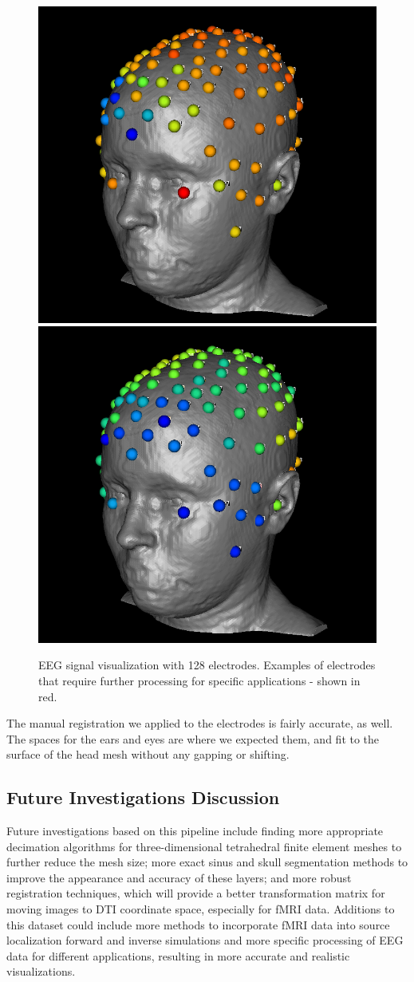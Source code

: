 \begin{figure}[H]
\begin{center}
\includegraphics[width=.49\textwidth]{Figures/128_eeg_1}
\includegraphics[width=.49\textwidth]{Figures/128_eeg_2}
\caption{EEG signal visualization with 128 electrodes. Examples of electrodes that require further processing for specific applications - shown in red.}
\label{fig:eegvis}
\end{center}
\end{figure}

The manual registration we applied to the electrodes is fairly accurate, as well. The spaces for the ears and eyes are where we expected them, and fit to the surface of the head mesh without any gapping or shifting. 

\subsection{Future Investigations Discussion}

Future investigations based on this pipeline include finding more appropriate decimation algorithms for three-dimensional tetrahedral finite element meshes to further reduce the mesh size; more exact sinus and skull segmentation methods to improve the appearance and accuracy of these layers; and more robust registration techniques, which will provide a better transformation matrix for moving images to DTI coordinate space, especially for fMRI data. Additions to this dataset could include more methods to incorporate fMRI data into source localization forward and inverse simulations and more specific processing of EEG data for different applications, resulting in more accurate and realistic visualizations. 


